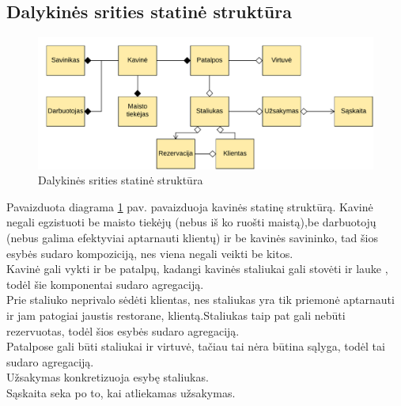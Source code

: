 \documentclass{VUMIFPSkursinis}
\begin{document}
\begin{landscape}
\subsection{Dalykinės srities statinė struktūra}

	\begin {figure}[H]
	\centering
		
		\includegraphics[scale=1]{img/3lab/Diagrama1}
		\caption{Dalykinės srities statinė struktūra}
		\label{fig:diagrama1}
	\end{figure}
\end{landscape}

Pavaizduota diagrama \ref{fig:diagrama1} pav. pavaizduoja kavinės statinę struktūrą. Kavinė negali egzistuoti be maisto tiekėjų (nebus iš ko ruošti maistą),be darbuotojų (nebus galima efektyviai aptarnauti klientų) ir be kavinės savininko, tad šios esybės sudaro kompoziciją, nes viena negali veikti be kitos.\\
Kavinė gali vykti ir be patalpų, kadangi kavinės staliukai gali stovėti ir 
lauke , todėl šie komponentai sudaro agregaciją.\\
Prie  staliuko  neprivalo  sėdėti  klientas,  nes
staliukas  yra  tik  priemonė  aptarnauti ir jam patogiai jaustis restorane,
klientą.Staliukas taip pat gali nebūti rezervuotas, todėl šios esybės sudaro agregaciją.\\
Patalpose gali būti staliukai ir virtuvė, tačiau tai nėra būtina sąlyga, todėl tai sudaro 
agregaciją.\\
Užsakymas konkretizuoja esybę staliukas.\\
Sąskaita seka po to, kai atliekamas užsakymas.\\
\end{document}
